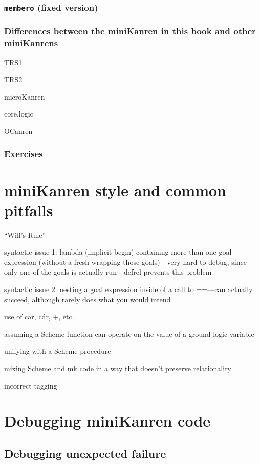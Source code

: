 \documentclass{book}
\begin{document}
\subsection{\texttt{membero} (fixed version)}

\subsection{Differences between the miniKanren in this book and other miniKanrens}

TRS1

TRS2

microKanren

core.logic

OCanren

\subsection{Exercises}


\chapter{miniKanren style and common pitfalls}%

``Will's Rule''

syntactic issue 1:
lambda (implicit begin) containing more than one goal expression (without a fresh wrapping those goals)---very hard to debug, since only one of the goals is actually run---defrel prevents this problem

syntactic issue 2:
nesting a goal expression inside of a call to ==---can actually succeed, although rarely does what you would intend

use of car, cdr, +, etc.

assuming a Scheme function can operate on the value of a ground logic variable

unifying with a Scheme procedure

mixing Scheme and mk code in a way that doesn't preserve relationality

incorrect tagging

\chapter{Debugging miniKanren code}%

\section{Debugging unexpected failure}
\end{document}
